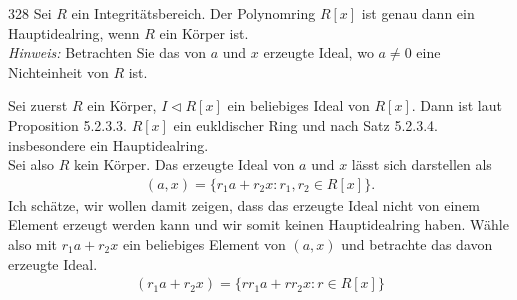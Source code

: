 \begin{algebraUE}{328}
Sei $R$ ein Integritätsbereich. Der Polynomring $R[x]$ ist genau dann ein
Hauptidealring, wenn $R$ ein Körper ist. \\
\textit{Hinweis:} Betrachten Sie das von $a$ und $x$ erzeugte Ideal, wo $a \neq 0$
eine Nichteinheit von $R$ ist.
\end{algebraUE}
\begin{solution}
Sei zuerst $R$ ein Körper, $I \vartriangleleft R[x]$ ein beliebiges Ideal von $R[x]$.
Dann ist laut Proposition 5.2.3.3. $R[x]$ ein eukldischer Ring und nach Satz 5.2.3.4.
insbesondere ein Hauptidealring. \\
Sei also $R$ kein Körper. Das erzeugte Ideal von $a$ und $x$ lässt sich darstellen als
\begin{align*}
  (a,x) = \{r_1a + r_2x: r_1,r_2 \in R[x]\}.
\end{align*}
Ich schätze, wir wollen damit zeigen, dass das erzeugte Ideal nicht von einem
Element erzeugt werden kann und wir somit keinen Hauptidealring haben.
Wähle also mit $r_1a + r_2x$ ein beliebiges Element von $(a,x)$
und betrachte das davon erzeugte Ideal.
\begin{align*}
  (r_1a + r_2x) = \{rr_1a + rr_2x: r \in R[x]\}
\end{align*}
\end{solution}
